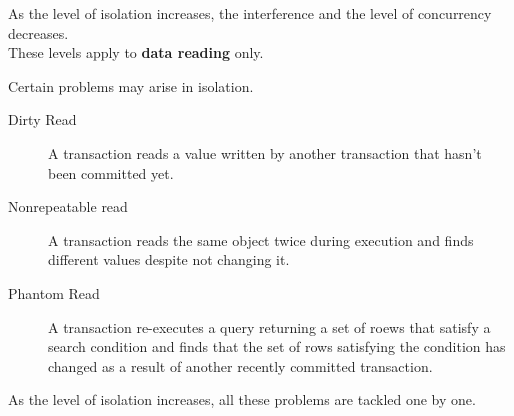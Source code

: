 \documentclass[11pt,a4paper,twocolumn]{book}
\begin{document}
As the level of isolation increases, the interference and the level of concurrency decreases.\\

These levels apply to \textbf{data reading} only.

Certain problems may arise in isolation.

\begin{description}
\item[Dirty Read] A transaction reads a value written by another transaction that hasn't been committed yet.
\item[Nonrepeatable read] A transaction reads the same object twice during execution and finds different values despite not changing it.
\item[Phantom Read] A transaction re-executes a query returning a set of roews that satisfy a search condition and finds that the set of rows satisfying the condition has changed as a result of another recently committed transaction.\end{description}

As the level of isolation increases, all these problems are tackled one by one.
\end{document}
